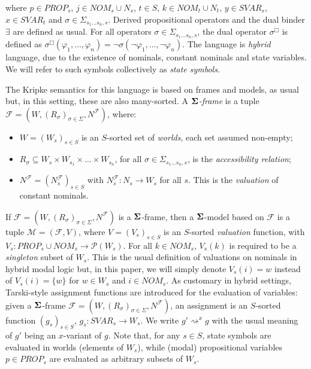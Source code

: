 \documentclass{easychair}
\theoremstyle{remark}
\begin{document}
    where $p \in PROP_s$, $j \in NOM_s \cup N_s$, $t\in S$, $k \in NOM_t \cup N_t$, $y \in SVAR_s$, $x \in SVAR_t$ and $\sigma \in \Sigma_{s_1...s_n,s}$. Derived propositional operators and the dual binder $\exists$ are defined as usual. For all operators $\sigma \in \Sigma_{s_1...s_n, s}$, the dual operator $\sigma^{\Box}$ is defined as $\sigma^{\Box}(\varphi_1,\dots,\varphi_n) = \neg \sigma(\neg \varphi_1,\dots,\neg \varphi_n)$. The language is \textit{hybrid} language, due to the existence of nominals, constant nominals and state variables. We will refer to such symbols collectively as \textit{state symbols}.



The Kripke semantics for this  language is  based on frames and models, as usual but, in this setting, these are also many-sorted. 
    A \textit{$\bf \Sigma$-frame} is a tuple $\mathcal{F} = (W, (R_\sigma)_{\sigma \in \Sigma}, N^{\mathcal{F}})$, where:
    \begin{itemize}
        \item $W = (W_s)_{s \in S}$ is an $S$-sorted set of \textit{worlds}, each set assumed non-empty;
        \item $R_\sigma \subseteq W_s \times W_{s_1} \times \dots \times W_{s_n}$, for all $\sigma \in \Sigma_{s_1...s_n,s}$, is the \textit{accessibility relation};
        \item  $N^{\mathcal{F}} = (N^{\mathcal{F}}_{s})_{s \in S}$ with $N^{\mathcal{F}}_{s} : N_s \to W_s$ for all $s$. This is the \textit{valuation} of constant nominals. 
    \end{itemize}
\noindent If  $\mathcal{F} = (W, (R_\sigma)_{\sigma \in \Sigma}, N^{\mathcal{F}})$  is a $\bf\Sigma$-frame, then a $\bf\Sigma$-model based on  $\mathcal{F}$ is a tuple $\mathcal{M} = (\mathcal{F}, V)$, where $V =(V_s)_{s \in S}$ is an $S$-sorted \textit{valuation} function, with $V_s : PROP_s \cup NOM_s \to \mathcal{P}(W_s)$. For all $k \in NOM_s$, $V_s(k)$ is required to be a \textit{singleton} subset of $W_s$. This is the usual definition of valuations  on nominals in hybrid modal logic but, in this paper, we will simply denote $V_s(i)=w$ instead of $V_s(i)=\{w\}$ for $w\in W_s$ and $i\in NOM_s$. As customary in hybrid settings, Tarski-style assignment functions are introduced for the evaluation of variables:
given a $\bf\Sigma$-frame $\mathcal{F} = (W, (R_\sigma)_{\sigma \in \Sigma}, N^{\mathcal{F}})$, an assignment is an $S$-sorted function $(g_s)_{s \in S}$, $g_s : SVAR_s \to W_s$. We write $g'\rightsquigarrow^x g$ with the usual meaning of $g'$ being an $x$-variant of $g$. Note that, for any $s\in S$,  state symbols are evaluated in worlds  (elements of $W_s$), while  (modal)  propositional variables $p\in PROP_s$  are evaluated as arbitrary subsets of $W_s$.
\end{document}
